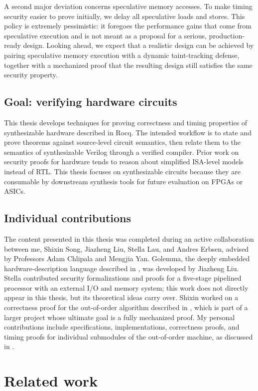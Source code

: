 \documentclass[fontset=fira-newtxsf]{mitthesis}
\theoremstyle{definition}
\theoremstyle{plain}
\begin{document}
A second major deviation concerns speculative memory accesses.
To make timing security easier to prove initially, we delay all speculative loads and stores.
This policy is extremely pessimistic: it foregoes the performance gains that come from speculative execution and is not meant as a proposal for a serious, production-ready design.
Looking ahead, we expect that a realistic design can be achieved by pairing speculative memory execution with a dynamic taint-tracking defense, together with a mechanized proof that the resulting design still satisfies the same security property.

\section{Goal: verifying hardware circuits}
This thesis develops techniques for proving correctness and timing properties of synthesizable hardware described in Rocq.
The intended workflow is to state and prove theorems against source-level circuit semantics, then relate them to the semantics of synthesizable Verilog through a verified compiler.
Prior work on security proofs for hardware tends to reason about simplified ISA-level models instead of RTL.
This thesis focuses on synthesizable circuits because they are consumable by downstream synthesis tools for future evaluation on FPGAs or ASICs.

\section{Individual contributions}
The content presented in this thesis was completed during an active collaboration between me, Shixin Song, Jiazheng Liu, Stella Lau, and Andres Erbsen, advised by Professors Adam Chlipala and Mengjia Yan.
Golemma, the deeply embedded hardware-description language described in , was developed by Jiazheng Liu.
Stella contributed security formalizations and proofs for a five-stage pipelined processor with an external I/O and memory system; this work does not directly appear in this thesis, but its theoretical ideas carry over.
Shixin worked on a correctness proof for the out-of-order algorithm described in , which is part of a larger project whose ultimate goal is a fully mechanized proof.
My personal contributions include specifications, implementations, correctness proofs, and timing proofs for individual submodules of the out-of-order machine, as discussed in .

\chapter{Related work} \label{chap:related}
\end{document}
